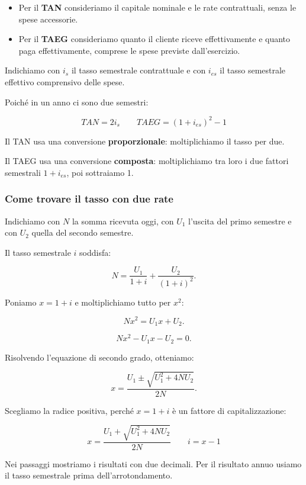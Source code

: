 \begin{itemize}
    \item Per il \textbf{TAN} consideriamo
    il capitale nominale e le rate contrattuali,
    senza le spese accessorie.

    \item Per il \textbf{TAEG} consideriamo
    quanto il cliente riceve effettivamente
    e quanto paga effettivamente,
    comprese le spese previste dall'esercizio.
\end{itemize}

\noindent Indichiamo con $i_s$ il tasso semestrale
contrattuale e con $i_{es}$ il tasso semestrale
effettivo comprensivo delle spese.

\noindent Poiché in un anno ci sono due semestri:

\[
\boxed{TAN=2i_s}
\qquad
\boxed{TAEG=(1+i_{es})^2-1}
\]

\noindent Il TAN usa una conversione
\textbf{proporzionale}: moltiplichiamo il tasso per due.

\noindent Il TAEG usa una conversione
\textbf{composta}: moltiplichiamo tra loro
i due fattori semestrali $1+i_{es}$,
poi sottraiamo 1.


\subsubsection*{Come trovare il tasso con due rate}

\noindent Indichiamo con $N$ la somma ricevuta oggi,
con $U_1$ l'uscita del primo semestre
e con $U_2$ quella del secondo semestre.

\noindent Il tasso semestrale $i$ soddisfa:

\[
N=\frac{U_1}{1+i}+\frac{U_2}{(1+i)^2}.
\]

\noindent Poniamo $x=1+i$ e moltiplichiamo tutto per $x^2$:

\[
Nx^2=U_1x+U_2.
\]

\[
Nx^2-U_1x-U_2=0.
\]

\noindent Risolvendo l'equazione di secondo grado,
otteniamo:

\[
x=\frac{U_1\pm\sqrt{U_1^2+4NU_2}}{2N}.
\]

\noindent Scegliamo la radice positiva,
perché $x=1+i$ è un fattore
di capitalizzazione:

\[
\boxed{
x=\frac{U_1+\sqrt{U_1^2+4NU_2}}{2N}
}
\qquad
\boxed{i=x-1}
\]

\noindent Nei passaggi mostriamo i risultati
con due decimali.
Per il risultato annuo usiamo il tasso semestrale
prima dell'arrotondamento.


